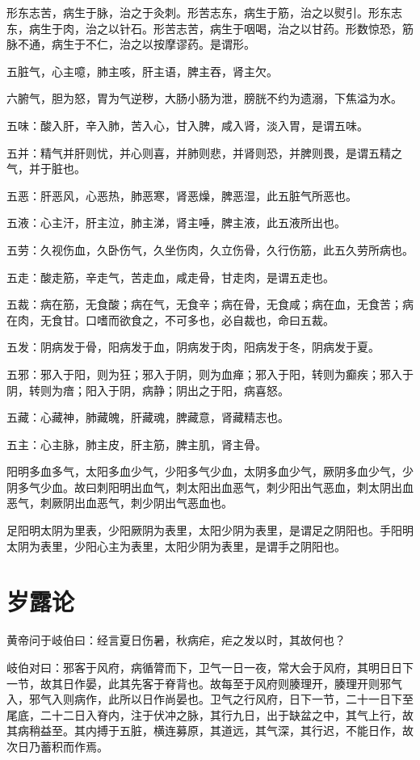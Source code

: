 \documentclass[a4paper,12pt,UTF8,twoside]{ctexbook}
\begin{document}
	形东志苦，病生于脉，治之于灸刺。形苦志东，病生于筋，治之以熨引。形东志东，病生于肉，治之以针石。形苦志苦，病生于咽喝，治之以甘药。形数惊恐，筋脉不通，病生于不仁，治之以按摩谬药。是谓形。
	
	五脏气，心主噫，肺主咳，肝主语，脾主吞，肾主欠。
	
	六腑气，胆为怒，胃为气逆秽，大肠小肠为泄，膀胱不约为遗溺，下焦溢为水。
	
	五味：酸入肝，辛入肺，苦入心，甘入脾，咸入肾，淡入胃，是谓五味。
	
	五并：精气并肝则忧，并心则喜，并肺则悲，并肾则恐，并脾则畏，是谓五精之气，并于脏也。
	
	五恶：肝恶风，心恶热，肺恶寒，肾恶燥，脾恶湿，此五脏气所恶也。
	
	五液：心主汗，肝主泣，肺主涕，肾主唾，脾主液，此五液所出也。
	
	五劳：久视伤血，久卧伤气，久坐伤肉，久立伤骨，久行伤筋，此五久劳所病也。
	
	五走：酸走筋，辛走气，苦走血，咸走骨，甘走肉，是谓五走也。
	
	五裁：病在筋，无食酸；病在气，无食辛；病在骨，无食咸；病在血，无食苦；病在肉，无食甘。口嗜而欲食之，不可多也，必自裁也，命曰五裁。
	
	五发：阴病发于骨，阳病发于血，阴病发于肉，阳病发于冬，阴病发于夏。
	
	五邪：邪入于阳，则为狂；邪入于阴，则为血瘅；邪入于阳，转则为癫疾；邪入于阴，转则为瘖；阳入于阴，病静；阴出之于阳，病喜怒。
	
	五藏：心藏神，肺藏魄，肝藏魂，脾藏意，肾藏精志也。
	
	五主：心主脉，肺主皮，肝主筋，脾主肌，肾主骨。
	
	阳明多血多气，太阳多血少气，少阳多气少血，太阴多血少气，厥阴多血少气，少阴多气少血。故曰刺阳明出血气，刺太阳出血恶气，刺少阳出气恶血，刺太阴出血恶气，刺厥阴出血恶气，刺少阴出气恶血也。
	
	足阳明太阴为里表，少阳厥阴为表里，太阳少阴为表里，是谓足之阴阳也。手阳明太阴为表里，少阳心主为表里，太阳少阴为表里，是谓手之阴阳也。
	
	\chapter{岁露论}
	
	黄帝问于岐伯曰：经言夏日伤暑，秋病疟，疟之发以时，其故何也？
	
	岐伯对曰：邪客于风府，病循膂而下，卫气一日一夜，常大会于风府，其明日日下一节，故其日作晏，此其先客于脊背也。故每至于风府则腠理开，腠理开则邪气入，邪气入则病作，此所以日作尚晏也。卫气之行风府，日下一节，二十一日下至尾底，二十二日入脊内，注于伏冲之脉，其行九日，出于缺盆之中，其气上行，故其病稍益至。其内搏于五脏，横连募原，其道远，其气深，其行迟，不能日作，故次日乃蓄积而作焉。
	
\end{document}
